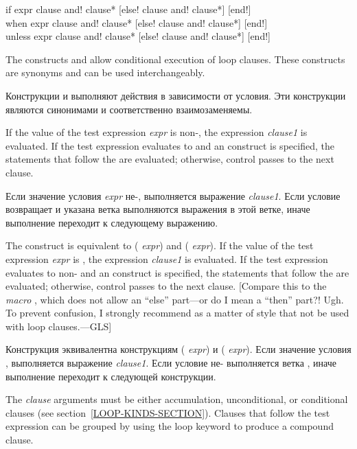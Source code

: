 \begin{defloop}
if expr clause {\!and! clause}*
   [\!else! clause {\!and! clause}*] [\!end!] \\
when expr clause {\!and! clause}*
     [\!else! clause {\!and! clause}*] [\!end!] \\
unless expr clause {\!and! clause}*
       [\!else! clause {\!and! clause}*] [\!end!]

The constructs  and  allow conditional execution of
loop clauses.  These constructs are synonyms and
can be used interchangeably.

Конструкции  и  выполняют действия в зависимости от
условия. Эти конструкции являются синонимами и соответственно взаимозаменяемы.

If the value of the test expression \emph{expr\/} is non-, the expression
\emph{clause1\/} is evaluated. If the test expression evaluates to 
and an  construct is specified, the statements that follow the
 are evaluated; otherwise, control passes to the next clause.

Если значение условия \emph{expr} не-, выполняется выражение
\emph{clause1}. Если условие возвращает  и указана ветка
 выполняются выражения в этой ветке, иначе выполнение
переходит к следующему выражению.

The  construct is equivalent to  ( 
\emph{expr\/}) and  ( \emph{expr\/}).
If the value of the test expression \emph{expr\/} is , the expression
\emph{clause1\/} is evaluated. If the test expression evaluates to 
non-
and an  construct is specified, the statements that follow the
 are evaluated; otherwise, control passes to the next clause.
[Compare this to the \emph{macro} ,
which does not allow an ``else'' part---or do I mean a ``then'' part?!  Ugh.
To prevent confusion, I strongly recommend as a matter of style
that  not be used with  loop clauses.---GLS]

Конструкция  эквивалентна конструкциям 
( \emph{expr}) и  ( \emph{expr}). Если
значение условия , выполняется выражение \emph{clause1}. Если
условие не- выполняется ветка , иначе выполнение
переходит к следующей конструкции.

The \emph{clause\/} arguments must be either accumulation, unconditional,
or conditional clauses (see section~\ref{LOOP-KINDS-SECTION}).
Clauses that follow the test expression can be grouped by using the 
loop keyword  to produce a compound 
clause.


\end{defloop}
